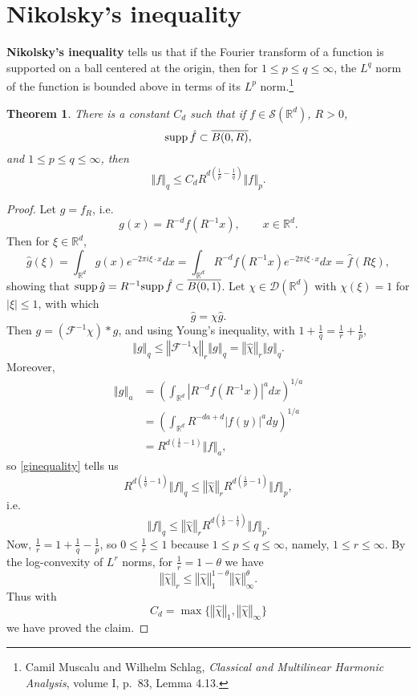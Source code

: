 \documentclass{article}
\newcommand{\supp}{\ensuremath\mathrm{supp}\,}
\newcommand{\norm}[1]{\left\Vert #1 \right\Vert}
\newtheorem{theorem}{Theorem}
\theoremstyle{definition}
\begin{document}
\section{Nikolsky's inequality}
\textbf{Nikolsky's inequality} tells us that if the Fourier transform of a function is supported on a ball centered at the origin, then
for $1 \leq p \leq q \leq \infty$, the $L^q$ norm of the function is bounded above in terms of its $L^p$ norm.\footnote{Camil Muscalu and Wilhelm Schlag, {\em Classical and Multilinear
Harmonic Analysis}, volume I, p.~83, Lemma 4.13.}

\begin{theorem}
There is a constant $C_d$ such that
if $f \in \mathscr{S}(\mathbb{R}^d)$, $R>0$, 
\[
\supp \hat{f} \subset \overline{B(0,R)},
\]
and $1 \leq p \leq q \leq \infty$, then
\[
\norm{f}_q \leq C_d R^{d\left(\frac{1}{p}-\frac{1}{q}\right)} \norm{f}_p.
\]
\end{theorem}
\begin{proof}
Let $g=f_{R}$, i.e. 
\[
g(x) = R^{-d} f(R^{-1}x), \qquad x \in \mathbb{R}^d.
\]
Then  for $\xi \in \mathbb{R}^d$,
\[
\hat{g}(\xi) = \int_{\mathbb{R}^d} g(x) e^{-2\pi i\xi\cdot x} dx
=\int_{\mathbb{R}^d} R^{-d} f(R^{-1}x) e^{-2\pi i\xi \cdot x} dx
=\hat{f}(R\xi),
\]
showing that $\supp \hat{g} = R^{-1} \supp \hat{f} \subset \overline{B(0,1)}$.
Let $\chi \in \mathscr{D}(\mathbb{R}^d)$ with $\chi(\xi)=1$ for $|\xi| \leq 1$, with which
\[
\hat{g}= \chi \hat{g}.
\]
Then $g = (\mathscr{F}^{-1} \chi)*g$, and using Young's inequality, with $1+\frac{1}{q}=\frac{1}{r}+\frac{1}{p}$,
\begin{equation}
\norm{g}_q\leq \norm{\mathscr{F}^{-1} \chi}_{r} \norm{g}_q=\norm{\hat{\chi}}_r \norm{g}_q.
\label{ginequality}
\end{equation}
Moreover,
\begin{align*}
\norm{g}_a &= \left( \int_{\mathbb{R}^d} |R^{-d} f(R^{-1}x)|^a dx \right)^{1/a}\\
&=\left( \int_{\mathbb{R}^d} R^{-da+d} |f(y)|^a dy \right)^{1/a}\\
&=R^{d\left(\frac{1}{a}-1\right)} \norm{f}_a,
\end{align*}
so \eqref{ginequality} tells us
\[
R^{d\left(\frac{1}{q}-1\right)} \norm{f}_q \leq \norm{\hat{\chi}}_r 
R^{d\left(\frac{1}{p}-1\right)} \norm{f}_p,
\]
i.e.
\[
\norm{f}_q \leq \norm{\hat{\chi}}_r R^{d\left(\frac{1}{p}-\frac{1}{q}\right)} \norm{f}_p.
\]
Now, $\frac{1}{r}=1+\frac{1}{q}-\frac{1}{p}$, so $0 \leq \frac{1}{r} \leq 1$ because $1 \leq p \leq q \leq \infty$, namely,
$1 \leq r \leq \infty$. 
By the log-convexity of $L^r$ norms, for $\frac{1}{r}=1-\theta$ we have
\[
\norm{\hat{\chi}}_r \leq \norm{\hat{\chi}}_1^{1-\theta} \norm{\hat{\chi}}_\infty^{\theta}.
\]
Thus with
\[
C_d = \max\{\norm{\hat{\chi}}_1,\norm{\hat{\chi}}_\infty\}
\]
we have proved the claim.
\end{proof}
\end{document}
